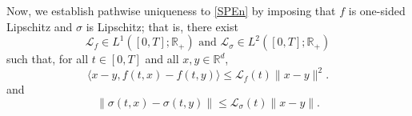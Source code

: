 \documentclass[preprint,12pt]{elsarticle}
\newcommand{\R}{\mathbb{R}}
\theoremstyle{plain}
\theoremstyle{definition}
\theoremstyle{remark}
\begin{document}

	Now, we establish pathwise uniqueness to \eqref{SPEn} by imposing that $f$ is one-sided Lipschitz and $\sigma$ is Lipschitz; that is, there exist $$\mathscr{L}_f\in L^1([0,T];\R_+) \text{ and }\mathscr{L}_\sigma\in L^2([0,T];\R_+)$$ such that, for all $t\in [0,T]$ and all $x,y\in \R^d$, 
	\begin{equation}\label{L-lips-fsig1}
		\langle x-y,f(t,x)-f(t,y)\rangle\leq \mathscr{L}_f(t)\|x-y\|^2.
	\end{equation}
and 
    \begin{equation}\label{L-lips-fsig2}
		\|\sigma(t,x)-\sigma(t,y)\|\leq \mathscr{L}_\sigma(t)\|x-y\|.
	\end{equation}
	
\end{document}
